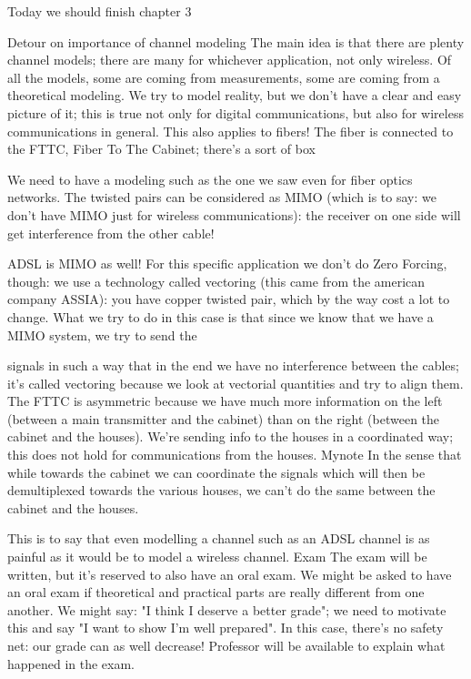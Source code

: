 {{{{Today we should finish chapter 3

Detour on importance of channel modeling The main idea is that there are plenty channel models; there are many for whichever application, not only wireless.
Of all the models, some are coming from measurements, some are coming from a theoretical modeling. We try to model reality, but we don't have a clear and easy picture of it; this is true not only for digital communications, but also for wireless communications in general. This also applies to fibers!
The fiber is connected to the FTTC, Fiber To The Cabinet; there's a sort of box

We need to have a modeling such as the one we saw even for fiber optics networks.
The twisted pairs can be considered as MIMO (which is to say: we don't have MIMO just for wireless communications): the receiver on one side will get interference from the other cable!

ADSL is MIMO as well! For this specific application we don't do Zero Forcing, though: we use a technology called vectoring (this came from the american company ASSIA): you have copper twisted pair, which by the way cost a lot to change. What we try to do in this case is that since we know that we have a MIMO system, we try to send the

signals in such a way that in the end we have no interference between the cables; it's called vectoring because we look at vectorial quantities and try to align them.
The FTTC is asymmetric because we have much more information on the left (between a main transmitter and the cabinet) than on the right (between the cabinet and the houses). We're sending info to the houses in a coordinated way; this does not hold for communications from the houses.
​Mynote In the sense that while towards the cabinet we can coordinate the signals which will then be demultiplexed towards the various houses, we can't do the same between the cabinet and the houses.

This is to say that even modelling a channel such as an ADSL channel is as painful as it would be to model a wireless channel.
Exam The exam will be written, but it's reserved to also have an oral exam.
We might be asked to have an oral exam if theoretical and practical parts are really different from one another.
We might say: "I think I deserve a better grade"; we need to motivate this and say
"I want to show I'm well prepared". In this case, there's no safety net: our grade can as well decrease!
Professor will be available to explain what happened in the exam.

}}}}
